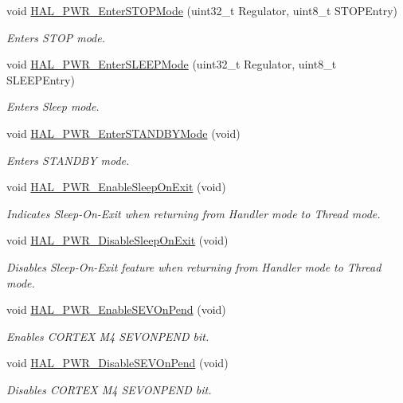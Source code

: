 \begin{DoxyCompactItemize}
void \hyperlink{group___p_w_r___exported___functions___group2_gacfca5f1062274423e08317c0a5a225fa}{H\+A\+L\+\_\+\+P\+W\+R\+\_\+\+Enter\+S\+T\+O\+P\+Mode} (uint32\+\_\+t Regulator, uint8\+\_\+t S\+T\+O\+P\+Entry)
\begin{DoxyCompactList}\small\item\em Enters S\+T\+OP mode. \end{DoxyCompactList}\item 
void \hyperlink{group___p_w_r___exported___functions___group2_ga5c84f4e046525c22d233c8a3443fab5f}{H\+A\+L\+\_\+\+P\+W\+R\+\_\+\+Enter\+S\+L\+E\+E\+P\+Mode} (uint32\+\_\+t Regulator, uint8\+\_\+t S\+L\+E\+E\+P\+Entry)
\begin{DoxyCompactList}\small\item\em Enters Sleep mode. \end{DoxyCompactList}\item 
void \hyperlink{group___p_w_r___exported___functions___group2_ga40736f74c169077fcd08f34470559aa2}{H\+A\+L\+\_\+\+P\+W\+R\+\_\+\+Enter\+S\+T\+A\+N\+D\+B\+Y\+Mode} (void)
\begin{DoxyCompactList}\small\item\em Enters S\+T\+A\+N\+D\+BY mode. \end{DoxyCompactList}\item 
void \hyperlink{group___p_w_r___exported___functions___group2_ga85d0154c96068b286072a64fca4c7e6a}{H\+A\+L\+\_\+\+P\+W\+R\+\_\+\+Enable\+Sleep\+On\+Exit} (void)
\begin{DoxyCompactList}\small\item\em Indicates Sleep-\/\+On-\/\+Exit when returning from Handler mode to Thread mode. \end{DoxyCompactList}\item 
void \hyperlink{group___p_w_r___exported___functions___group2_ga1da299e8186a3e08a694865bd41c3bb0}{H\+A\+L\+\_\+\+P\+W\+R\+\_\+\+Disable\+Sleep\+On\+Exit} (void)
\begin{DoxyCompactList}\small\item\em Disables Sleep-\/\+On-\/\+Exit feature when returning from Handler mode to Thread mode. \end{DoxyCompactList}\item 
void \hyperlink{group___p_w_r___exported___functions___group2_ga6f33b1c8c8cc85129c68ac302a281033}{H\+A\+L\+\_\+\+P\+W\+R\+\_\+\+Enable\+S\+E\+V\+On\+Pend} (void)
\begin{DoxyCompactList}\small\item\em Enables C\+O\+R\+T\+EX M4 S\+E\+V\+O\+N\+P\+E\+ND bit. \end{DoxyCompactList}\item 
void \hyperlink{group___p_w_r___exported___functions___group2_ga7811014def9b864dd490a63ada4bab68}{H\+A\+L\+\_\+\+P\+W\+R\+\_\+\+Disable\+S\+E\+V\+On\+Pend} (void)
\begin{DoxyCompactList}\small\item\em Disables C\+O\+R\+T\+EX M4 S\+E\+V\+O\+N\+P\+E\+ND bit. \end{DoxyCompactList}\end{DoxyCompactItemize}


